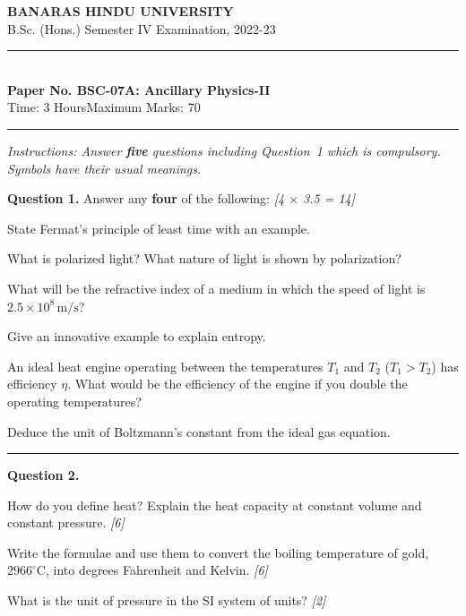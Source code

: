 \documentclass[11pt,a4paper]{article}
\newcommand{\pts}[1]{\hfill   \textit{[#1]}}
\begin{document}
\begin{center}
  {\large\bfseries BANARAS HINDU UNIVERSITY}\\[2pt]
  {\normalsize B.Sc. (Hons.) Semester IV Examination, 2022-23}\\[6pt]
  \rule{0.8\linewidth}{0.5pt}\\[6pt]
  {\large\bfseries Paper No. BSC-07A: Ancillary Physics-II}\\[4pt]
  {\normalsize Time: 3 Hours\hfill Maximum Marks: 70}
\end{center}
\rule{\linewidth}{0.4pt}
\smallskip



\noindent   \textit{Instructions: Answer   \textbf{five} questions including Question~1 which is compulsory. Symbols have their usual meanings.}
\bigskip




\noindent   \textbf{Question 1.} Answer any   \textbf{four} of the following: \pts{4 $ \times$ 3.5 = 14}

\begin{parts}
  \item State Fermat's principle of least time with an example.
  \item What is polarized light? What nature of light is shown by polarization?
  \item What will be the refractive index of a medium in which the speed of light is $2.5  \times 10^8\, \text{m/s}$?
  \item Give an innovative example to explain entropy.
  \item An ideal heat engine operating between the temperatures $T_1$ and $T_2$ ($T_1 > T_2$) has efficiency $\eta$. What would be the efficiency of the engine if you double the operating temperatures?
  \item Deduce the unit of Boltzmann's constant from the ideal gas equation.
\end{parts}

\medskip\rule{\linewidth}{0.2pt}




\noindent   \textbf{Question 2.}

\begin{parts}
  \item How do you define heat? Explain the heat capacity at constant volume and constant pressure. \pts{6}
  \item Write the formulae and use them to convert the boiling temperature of gold, $2966^\circ \text{C}$, into degrees Fahrenheit and Kelvin. \pts{6}
  \item What is the unit of pressure in the SI system of units? \pts{2}
\end{parts}
\end{document}
